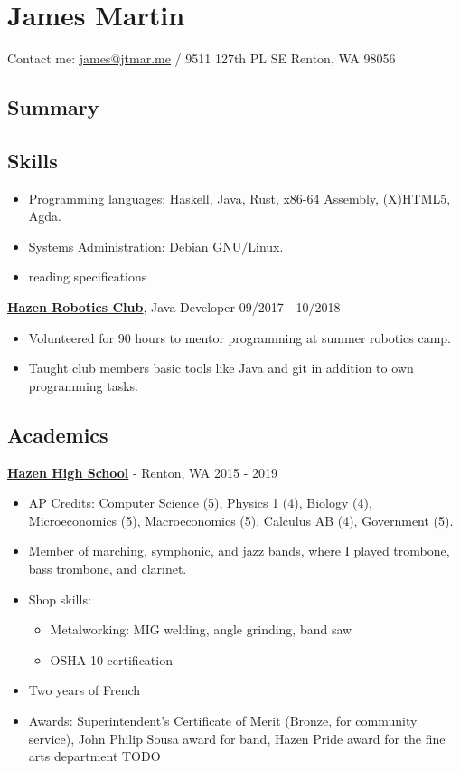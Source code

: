 \documentclass[12pt]{extarticle}
\author{James Martin}
\begin{document}
\section{James Martin}
Contact me: \href{mailto:James\%20Martin<james@jtmar.me>}{james@jtmar.me} / 9511 127th PL SE Renton, WA 98056

\subsection{Summary}

\subsection{Skills}
\begin{itemize}
\item Programming languages: Haskell, Java, Rust, x86-64 Assembly, (X)HTML5, Agda.
\item Systems Administration: Debian GNU/Linux.
\item reading specifications
\end{itemize}

\textbf{\href{https://github.com/HazenRobotics}{Hazen Robotics Club}}, Java Developer \hfill 09/2017 - 10/2018
\begin{itemize}
\item Volunteered for 90 hours to mentor programming at summer robotics camp.
\item Taught club members basic tools like Java and git in addition to own programming tasks.
\end{itemize}

\subsection{Academics}
\textbf{\href{https://www.rentonschools.us/hazen}{Hazen High School}} - Renton, WA \hfill 2015 - 2019
\begin{itemize}
\item AP Credits: Computer Science (5), Physics 1 (4), Biology (4), Microeconomics (5), Macroeconomics (5), Calculus AB (4), Government (5).
\item Member of marching, symphonic, and jazz bands, where I played trombone, bass trombone, and clarinet.
\item Shop skills:
  \begin{itemize}
  \item Metalworking: MIG welding, angle grinding, band saw
  \item OSHA 10 certification
  \end{itemize}
\item Two years of French
\item Awards: Superintendent's Certificate of Merit (Bronze, for community service), John Philip Sousa award for band, Hazen Pride award for the fine arts department TODO
\end{itemize}
\end{document}
